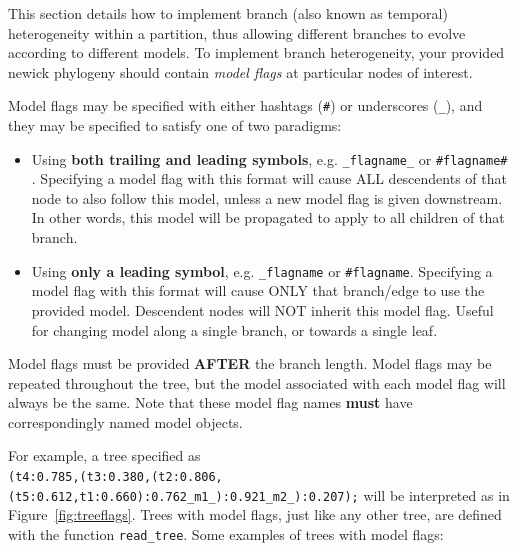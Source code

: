 \documentclass{article}
\newcommand{\code}[1]{\texttt{\small{#1}}}
\begin{document}
This section details how to implement branch (also known as temporal) heterogeneity within a partition, thus allowing different branches to evolve according to different models. To implement branch heterogeneity, your provided newick phylogeny should contain \emph{model flags} at particular nodes of interest.

Model flags may be specified with either hashtags (\code{\#}) or underscores (\code{\_}), and they may be specified to satisfy one of two paradigms:
\begin{itemize}
\item Using \textbf{both trailing and leading symbols}, e.g. \code{\_flagname\_} or \code{\#flagname\#} . Specifying a model flag with this format will cause ALL descendents of that node to also follow this model, unless a new model flag is given downstream. In other words, this model will be propagated to apply to all children of that branch.
\item Using \textbf{only a leading symbol}, e.g. \code{\_flagname} or \code{\#flagname}. Specifying a model flag with this format will cause ONLY that branch/edge to use the provided model. Descendent nodes will NOT inherit this model flag. Useful for changing model along a single branch, or towards a single leaf.
\end{itemize}   
Model flags must be provided \textbf{AFTER} the branch length.
Model flags may be repeated throughout the tree, but the model associated with each model flag will always be the same. Note that these model flag names \textbf{must} have correspondingly named model objects.
     
For example, a tree specified as  \\ \texttt{\normalsize{(t4:0.785,(t3:0.380,(t2:0.806,(t5:0.612,t1:0.660):0.762\_m1\_):0.921\_m2\_):0.207);}} will be interpreted as in Figure~\ref{fig:treeflags}. Trees with model flags, just like any other tree, are defined with the function \code{read\_tree}. Some examples of trees with model flags:
\end{document}

